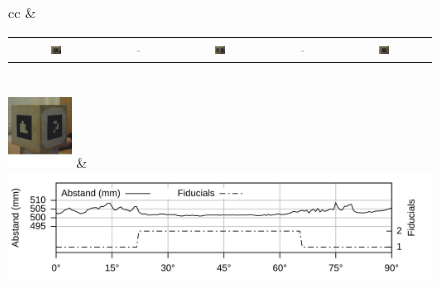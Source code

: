  \begin{figure}[h]
    \centering


     \begin{tabular}{cc}%
& 
 \begin{tabular}{ccccc}
 \includegraphics[width=0.12\textwidth]{../graphics/position/testcube_1x1_0_cropped.jpg}  & 
  \includegraphics[width=0.08\textwidth]{../graphics/position/testcube_arrow.png} &
\includegraphics[width=0.12\textwidth]{../graphics/position/testcube_1x1_45_cropped_noshift.jpg}  &
  \includegraphics[width=0.08\textwidth]{../graphics/position/testcube_arrow.png} &
\includegraphics[width=0.12\textwidth]{../graphics/position/testcube_1x1_90_cropped.jpg} \\
\end{tabular}
\\
    \includegraphics[width=0.15\textwidth]{../graphics/position/testcube_1x1_45_cropped.jpg} &
    \includegraphics[width=12cm]{../graphics/position/graph_marker_eval_1x1.svg}\\


\end{tabular}
\end{figure}
